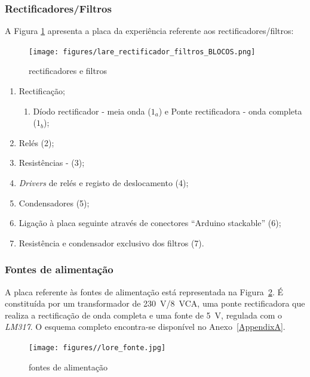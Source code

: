 \subsubsection{Rectificadores/Filtros}
A Figura \ref{fig:placarectificadores} apresenta a placa da experiência referente aos rectificadores/filtros:

\begin{figure}[hbtp]
	\centering
	\texttt{[image: figures/lare\_rectificador\_filtros\_BLOCOS.png]}
	\caption{ rectificadores e filtros}
	\label{fig:placarectificadores}
\end{figure}
 
\begin{enumerate}
	\item Rectificação;
		\begin{enumerate}
			\item \label{diodos}Díodo rectificador - meia onda ($1_{a}$) e Ponte rectificadora - onda completa ($1_{b}$);	
		\end{enumerate}
    \item Relés (2);
    \item Resistências - (3);
  	\item \textit{Drivers} de relés e registo de deslocamento (4);
	\item Condensadores (5);
	\item Ligação à placa seguinte através de conectores ``Arduino stackable'' (6);
	\item Resistência e condensador exclusivo dos filtros (7).
\end{enumerate}

\subsubsection{Fontes de alimentação}
A placa referente às fontes de alimentação está representada na Figura~\ref{fig:placartransformador}. É constituída por um transformador de \SI{230}{\volt}/\SI{8}{\volt}CA, uma ponte rectificadora que realiza a rectificação de onda completa e uma fonte de \SI{5}{\volt}, regulada com o \textit{LM317}\cite{LM317}. O esquema completo encontra-se disponível no Anexo~\ref{AppendixA}.

\begin{figure}[hbtp]
	\centering
	\texttt{[image: figures//lore\_fonte.jpg]}
	\caption{ fontes de alimentação}
	\label{fig:placartransformador}
\end{figure}

